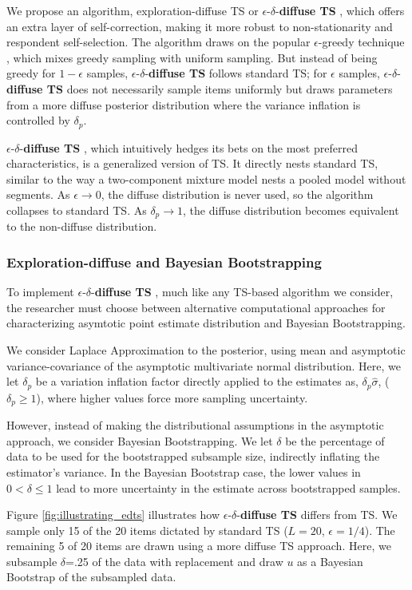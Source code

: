 \documentclass[a4paper,11pt]{article}
\newcommand{\edts}{$\epsilon$-$\delta$-\textbf{diffuse TS} }
\newcommand{\numperset}{L}
\begin{document}
We propose an algorithm, exploration-diffuse TS or \edts, which offers an extra layer of self-correction, making it more robust to non-stationarity and respondent self-selection. The algorithm draws on the popular $\epsilon$-greedy technique \citep{SuttonBarto1998}, which mixes greedy sampling with uniform sampling. But instead of being greedy for $1-\epsilon$ samples, \edts follows standard TS; for $\epsilon$ samples, \edts does not necessarily sample items uniformly but draws parameters from a more diffuse posterior distribution where the variance inflation is controlled by $\delta_p$.

\edts, which intuitively hedges its bets on the most preferred characteristics, is a generalized version of TS. It directly nests standard TS, similar to the way a two-component mixture model nests a pooled model without segments. As $\epsilon \to 0$, the diffuse distribution is never used, so the algorithm collapses to standard TS. As $\delta_p \to 1$, the diffuse distribution becomes equivalent to the non-diffuse distribution. 

\subsubsection{Exploration-diffuse and Bayesian Bootstrapping}

To implement \edts, much like any TS-based algorithm we consider, the researcher must choose between alternative computational approaches for characterizing asymtotic point estimate distribution and Bayesian Bootstrapping. 

We consider Laplace Approximation to the posterior, using mean and asymptotic variance-covariance of the asymptotic multivariate normal distribution. Here, we let $\delta_p$ be a variation inflation factor directly applied to the estimates as, $\delta_p  \hat \sigma$, ($\delta_p \geq 1$), where higher values force more sampling uncertainty.

However, instead of making the distributional assumptions in the asymptotic approach, we consider Bayesian Bootstrapping. We let $\delta$ be the percentage of data to be used for the bootstrapped subsample size, indirectly inflating the estimator's variance. In the Bayesian Bootstrap case, the lower values in $0 < \delta \leq 1$ lead to more uncertainty in the estimate across bootstrapped samples.

Figure \ref{fig:illustrating_edts} illustrates how \edts differs from TS. We sample only 15 of the 20 items dictated by standard TS ($\numperset=20$, $\epsilon=1/4$). The remaining 5 of 20 items are drawn using a more diffuse TS approach. Here, we subsample $\delta$=.25 of the data with replacement and draw $u$ as a Bayesian Bootstrap of the subsampled data. 
\end{document}
